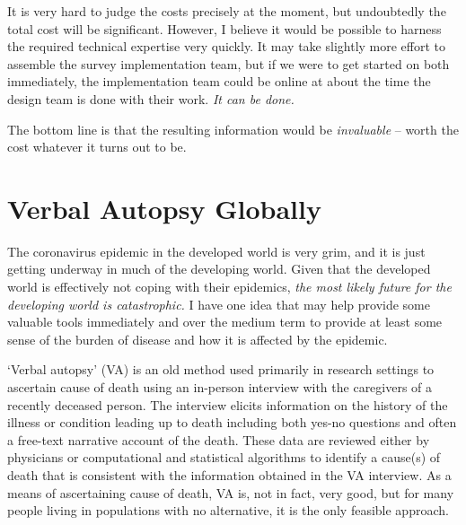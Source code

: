 \documentclass[12pt]{article}
\begin{document}
It is very hard to judge the costs precisely at the moment, but undoubtedly the total cost will be significant. However, I believe it would be possible to harness the required technical expertise very quickly. It may take slightly more effort to assemble the survey implementation team, but if we were to get started on both immediately, the implementation team could be online at about the time the design team is done with their work. \textit{It can be done.}

The bottom line is that the resulting information would be \textit{invaluable} -- worth the cost whatever it turns out to be.


\section{Verbal Autopsy Globally}

The coronavirus epidemic in the developed world is very grim, and it is just getting underway in much of the developing world.  Given that the developed world is effectively not coping with their epidemics, \textit{the most likely future for the developing world is catastrophic.}  I have one idea that may help provide some valuable tools immediately and over the medium term to provide at least some sense of the burden of disease and how it is affected by the epidemic.

`Verbal autopsy' (VA) is an old method used primarily in research settings to ascertain cause of death using an in-person interview with the caregivers of a recently deceased person.  The interview elicits information on the history of the illness or condition leading up to death including both yes-no questions and often a free-text narrative account of the death.  These data are reviewed either by physicians or computational and statistical algorithms to identify a cause(s) of death that is consistent with the information obtained in the VA interview.  As a means of ascertaining cause of death, VA is, not in fact, very good, but for many people living in populations with no alternative, it is the only feasible approach.  
\end{document}
